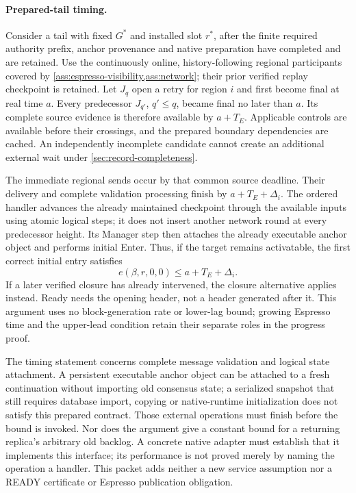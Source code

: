 \paragraph{Prepared-tail timing.}
\label{sec:source-step-timing}
Consider a tail with fixed $G^*$ and installed slot $r^*$, after the
finite required authority prefix, anchor provenance and native
preparation have completed and are retained. Use the continuously
online, history-following regional participants covered by
\cref{ass:espresso-visibility,ass:network}; their prior verified replay
checkpoint is retained. Let $J_q$ open a retry for region $i$ and first
become final at real time $a$. Every predecessor $J_{q'}$, $q'\le q$,
became final no later than $a$. Its complete source evidence is therefore
available by $a+T_E$. Applicable controls are available before their
crossings, and the prepared boundary dependencies are cached. An independently incomplete
candidate cannot create an additional external wait under
\cref{sec:record-completeness}.

The immediate regional sends occur by that common source deadline.
Their delivery and complete validation processing finish by
$a+T_E+\Delta_i$. The ordered handler advances the already maintained
checkpoint through the available inputs using atomic logical steps;
it does not insert another network round at every predecessor height.
Its Manager step then attaches the already executable anchor object
and performs initial Enter. Thus, if the target remains activatable,
the first correct initial entry satisfies
\[
 e(\beta,r,0,0)\le a+T_E+\Delta_i.
\]
If a later verified closure has already intervened, the closure
alternative applies instead. Ready needs the opening header, not a
header generated after it. This argument uses no block-generation rate
or lower-lag bound; growing Espresso time and the upper-lead condition
retain their separate roles in the progress proof.

The timing statement concerns complete message validation and logical
state attachment. A persistent executable anchor object can be attached
to a fresh continuation without importing old consensus state; a
serialized snapshot that still requires database import, copying or
native-runtime initialization does not satisfy this prepared contract.
Those external operations must finish before the bound is invoked.
Nor does the argument give a constant bound for a returning replica's
arbitrary old backlog. A concrete native adapter must establish that it
implements this interface; its performance is not proved merely by
naming the operation a handler. This packet adds neither a new service
assumption nor a READY certificate or Espresso publication obligation.
